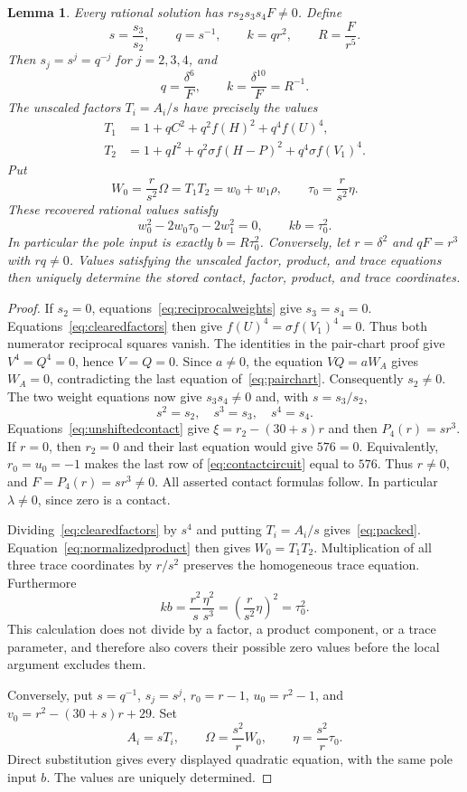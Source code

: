 \documentclass[11pt,a4paper]{article}
\newtheorem{lemma}[theorem]{Lemma}
\begin{document}
\begin{lemma}\label{lem:domain}
Every rational solution has $rs_2s_3s_4F\ne0$. Define
\[
 s=\frac{s_3}{s_2},\qquad q=s^{-1},\qquad
 k=qr^2,\qquad R=\frac{F}{r^5}.
\]
Then $s_j=s^j=q^{-j}$ for $j=2,3,4$, and
\[
 q=\frac{\delta^6}{F},\qquad k=\frac{\delta^{10}}F=R^{-1}.
\]
The unscaled factors $T_i=A_i/s$ have precisely the values
\begin{equation}\label{eq:packed}
\begin{split}
 T_1&=1+qC^2+q^2f(H)^2+q^4f(U)^4,\\
 T_2&=1+qI^2+q^2\sigma f(H-P)^2+q^4\sigma f(V_1)^4.
\end{split}
\end{equation}
Put
\[
 W_0=\frac r{s^2}\Omega=T_1T_2=w_0+w_1\rho,
 \qquad \tau_0=\frac r{s^2}\eta.
\]
These recovered rational values satisfy
\begin{equation}\label{eq:trace}
                  w_0^2-2w_0\tau_0-2w_1^2=0,
                  \qquad kb=\tau_0^2.
\end{equation}
In particular the pole input is exactly $b=R\tau_0^2$.
Conversely, let $r=\delta^2$ and $qF=r^3$ with $rq\ne0$.
Values satisfying the unscaled factor, product, and trace equations
then uniquely determine the stored contact, factor, product, and
trace coordinates.
\end{lemma}
\begin{proof}
If $s_2=0$, equations~\eqref{eq:reciprocalweights} give $s_3=s_4=0$.
Equations~\eqref{eq:clearedfactors} then give
$f(U)^4=\sigma f(V_1)^4=0$. Thus both numerator reciprocal squares
vanish. The identities in the pair-chart proof give $V^4=Q^4=0$,
hence $V=Q=0$. Since $a\ne0$, the equation $VQ=aW_A$ gives
$W_A=0$, contradicting the last equation of~\eqref{eq:pairchart}.
Consequently $s_2\ne0$. The two weight equations now give
$s_3s_4\ne0$ and, with $s=s_3/s_2$,
\[
                         s^2=s_2,\quad s^3=s_3,\quad s^4=s_4.
\]
Equations~\eqref{eq:unshiftedcontact} give
$\xi=r_2-(30+s)r$ and then $P_4(r)=sr^3$.
If $r=0$, then $r_2=0$ and their last equation would give $576=0$.
Equivalently, $r_0=u_0=-1$ makes the last row of
\eqref{eq:contactcircuit} equal to $576$. Thus $r\ne0$, and
$F=P_4(r)=sr^3\ne0$. All asserted contact formulas follow.
In particular $\lambda\ne0$, since zero is a contact.

Dividing~\eqref{eq:clearedfactors} by $s^4$ and putting $T_i=A_i/s$
gives~\eqref{eq:packed}. Equation~\eqref{eq:normalizedproduct}
then gives $W_0=T_1T_2$. Multiplication of all three trace coordinates
by $r/s^2$ preserves the homogeneous trace equation. Furthermore
\[
 kb=\frac{r^2}s\frac{\eta^2}{s^3}
    =\left(\frac r{s^2}\eta\right)^2=\tau_0^2.
\]
This calculation does not divide by a factor, a product component,
or a trace parameter, and therefore also covers their possible zero
values before the local argument excludes them.

Conversely, put $s=q^{-1}$, $s_j=s^j$,
$r_0=r-1$, $u_0=r^2-1$, and
$v_0=r^2-(30+s)r+29$. Set
\[
 A_i=sT_i,\qquad \Omega=\frac{s^2}rW_0,
 \qquad \eta=\frac{s^2}r\tau_0.
\]
Direct substitution gives every displayed quadratic equation, with
the same pole input $b$. The values are uniquely determined.
\end{proof}
\end{document}
